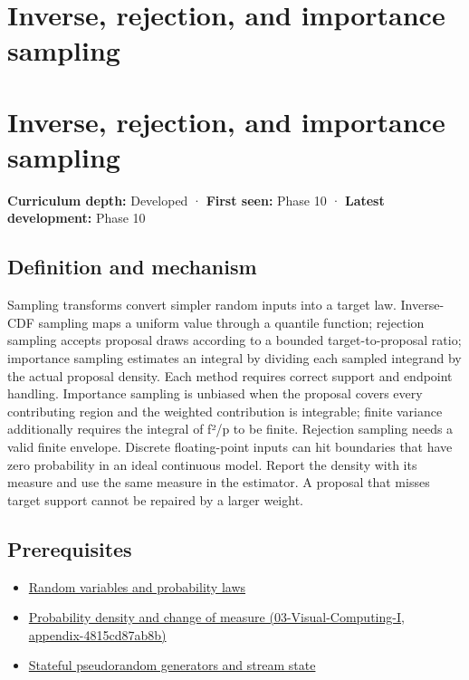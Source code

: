 \hypertarget{appendix-8d863ed954d0}{}
\section*{Inverse, rejection, and importance sampling}
\section{Inverse, rejection, and importance sampling}\label{inverse-rejection-and-importance-sampling}

\textbf{Curriculum depth:} Developed · \textbf{First seen:} Phase 10 · \textbf{Latest development:} Phase 10

\subsection{Definition and mechanism}\label{definition-and-mechanism}

Sampling transforms convert simpler random inputs into a target law. Inverse-CDF sampling maps a uniform value through a quantile function; rejection sampling accepts proposal draws according to a bounded target-to-proposal ratio; importance sampling estimates an integral by dividing each sampled integrand by the actual proposal density. Each method requires correct support and endpoint handling. Importance sampling is unbiased when the proposal covers every contributing region and the weighted contribution is integrable; finite variance additionally requires the integral of f²/p to be finite. Rejection sampling needs a valid finite envelope. Discrete floating-point inputs can hit boundaries that have zero probability in an ideal continuous model. Report the density with its measure and use the same measure in the estimator. A proposal that misses target support cannot be repaired by a larger weight.

\subsection{Prerequisites}\label{prerequisites}

\begin{itemize}
\tightlist
\item
  \hyperref[appendix-4d0203f7944f]{Random variables and probability laws}
\item
  \href{}{Probability density and change of measure (03-Visual-Computing-I, appendix-4815cd87ab8b)}
\item
  \hyperref[appendix-e0f7c7e08f3a]{Stateful pseudorandom generators and stream state}
\end{itemize}

